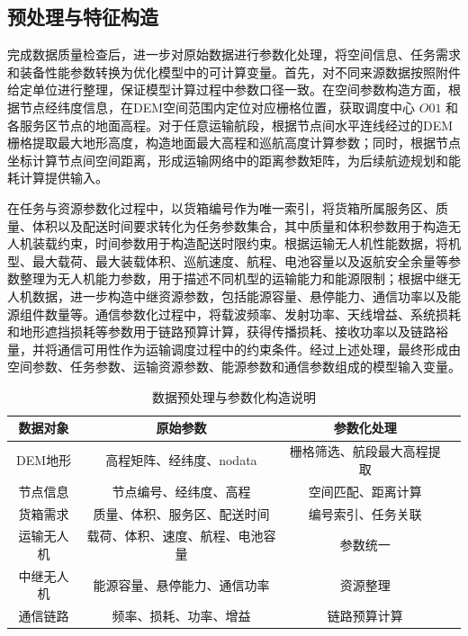 \subsection{预处理与特征构造}
{完成数据质量检查后，进一步对原始数据进行参数化处理，将空间信息、任务需求和装备性能参数转换为优化模型中的可计算变量。首先，对不同来源数据按照附件给定单位进行整理，保证模型计算过程中参数口径一致。在空间参数构造方面，根据节点经纬度信息，在DEM空间范围内定位对应栅格位置，获取调度中心 \(O01\) 和各服务区节点的地面高程。对于任意运输航段，根据节点间水平连线经过的DEM栅格提取最大地形高度，构造地面最大高程和巡航高度计算参数；同时，根据节点坐标计算节点间空间距离，形成运输网络中的距离参数矩阵，为后续航迹规划和能耗计算提供输入。
	
	在任务与资源参数化过程中，以货箱编号作为唯一索引，将货箱所属服务区、质量、体积以及配送时间要求转化为任务参数集合，其中质量和体积参数用于构造无人机装载约束，时间参数用于构造配送时限约束。根据运输无人机性能数据，将机型、最大载荷、最大装载体积、巡航速度、航程、电池容量以及返航安全余量等参数整理为无人机能力参数，用于描述不同机型的运输能力和能源限制；根据中继无人机数据，进一步构造中继资源参数，包括能源容量、悬停能力、通信功率以及能源组件数量等。通信参数化过程中，将载波频率、发射功率、天线增益、系统损耗和地形遮挡损耗等参数用于链路预算计算，获得传播损耗、接收功率以及链路裕量，并将通信可用性作为运输调度过程中的约束条件。经过上述处理，最终形成由空间参数、任务参数、运输资源参数、能源参数和通信参数组成的模型输入变量。}
\begin{table}[htbp]
	\centering
	\caption{数据预处理与参数化构造说明}
	\label{tab:parameter_construct}
	\begin{tabularx}{0.95\textwidth}{cccc}
		\toprule
		数据对象 & 原始参数 & 参数化处理  \\
		\midrule
		DEM地形 
		& 高程矩阵、经纬度、nodata 
		& 栅格筛选、航段最大高程提取 \\
		
		节点信息 
		& 节点编号、经纬度、高程 
		& 空间匹配、距离计算  \\
		
		货箱需求 
		& 质量、体积、服务区、配送时间 
		& 编号索引、任务关联  \\
		
		运输无人机 
		& 载荷、体积、速度、航程、电池容量 
		& 参数统一  \\
		
		中继无人机 
		& 能源容量、悬停能力、通信功率 
		& 资源整理  \\
		
		通信链路 
		& 频率、损耗、功率、增益 
		& 链路预算计算  \\
		\bottomrule
	\end{tabularx}
\end{table}

